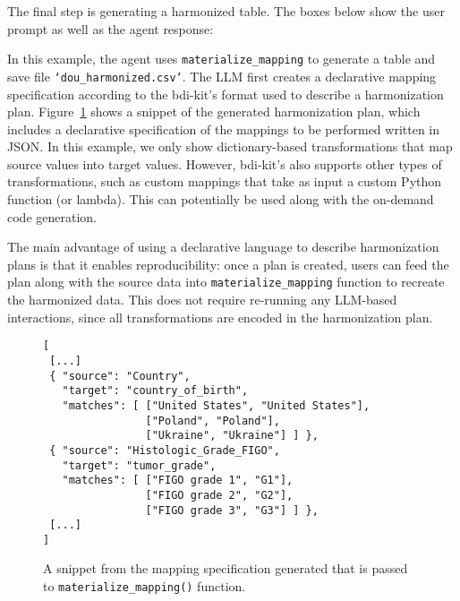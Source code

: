 
The final step is generating a harmonized table. The boxes below show the user prompt as well as the agent response:

\vbox{
}
\noindent
In this example, the agent uses \texttt{materialize\_mapping} to generate a table and save file \texttt{`dou\_harmonized.csv'}. The LLM  first creates a declarative mapping specification according to the bdi-kit's format used to describe a harmonization plan. Figure~\ref{fig:mapping-spec} shows a snippet of the generated harmonization plan, which includes a declarative specification of the mappings to be performed written in JSON. In this example, we only show dictionary-based transformations that map source values into target values. However, bdi-kit's also supports other types of transformations, such as custom mappings that take as input a custom Python function (or lambda).
This can potentially be used along with the on-demand code generation.

The main advantage of using a declarative language to describe harmonization plans is that it enables reproducibility: once a plan is created, users can feed the plan along with the source data into \texttt{materialize\_mapping} function to recreate the harmonized data. This does not require re-running any LLM-based interactions, since all transformations are encoded in the harmonization plan.

\begin{figure}[h]
\vspace{-.75em}
\begin{tcolorbox}[colback=black!2.5!white,colframe=black!85!black,boxrule=0.25mm,boxsep=4pt,left=0pt,right=0pt,top=0pt,bottom=0pt]
\begin{verbatim}
[ 
 [...]
 { "source": "Country",
   "target": "country_of_birth",
   "matches": [ ["United States", "United States"],
                ["Poland", "Poland"],
                ["Ukraine", "Ukraine"] ] },
 { "source": "Histologic_Grade_FIGO",
   "target": "tumor_grade",
   "matches": [ ["FIGO grade 1", "G1"],
                ["FIGO grade 2", "G2"],
                ["FIGO grade 3", "G3"] ] },
 [...]
]
\end{verbatim}
\end{tcolorbox}
\vspace{-1.25em}
\caption{A snippet from the mapping specification generated that is passed to \texttt{materialize\_mapping()} function.}
\label{fig:mapping-spec}
\end{figure}